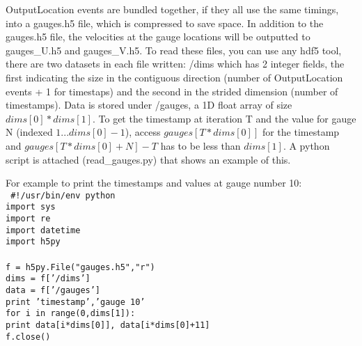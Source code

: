 \documentclass[11pt]{article}
\begin{document}
OutputLocation events are bundled together, if they all use the same timings, into a gauges.h5 file, which is compressed to save space. In addition to the gauges.h5 file, the velocities at the gauge locations will be outputted to gauges\_U.h5 and gauges\_V.h5. To read these files, you can use any hdf5 tool, there are two datasets in each file written: /dims which has 2 integer fields, the first indicating the size in the contiguous direction (number of OutputLocation events + 1 for timestaps) and the second in the strided dimension (number of timestamps). Data is stored under /gauges, a 1D float array of size $dims[0]*dims[1]$. To get the timestamp at iteration T and the value for gauge N (indexed $1...dims[0]-1$), access $gauges[T*dims[0]]$ for the timestamp and $gauges[T*dims[0]+N] - T$ has to be less than $dims[1]$. A python script is attached (read\_gauges.py) that shows an example of this.

For example to print the timestamps and values at gauge number 10: \\
{\tt
\#!/usr/bin/env python \\
import sys \\
import re \\
import datetime \\
import h5py \\
 \\
f = h5py.File("gauges.h5","r") \\
dims = f['/dims'] \\
data = f['/gauges'] \\
print 'timestamp','gauge 10'\\
for i in range(0,dims[1]): \\
print data[i*dims[0]], data[i*dims[0]+11] \\
f.close() \\
}
\end{document}
